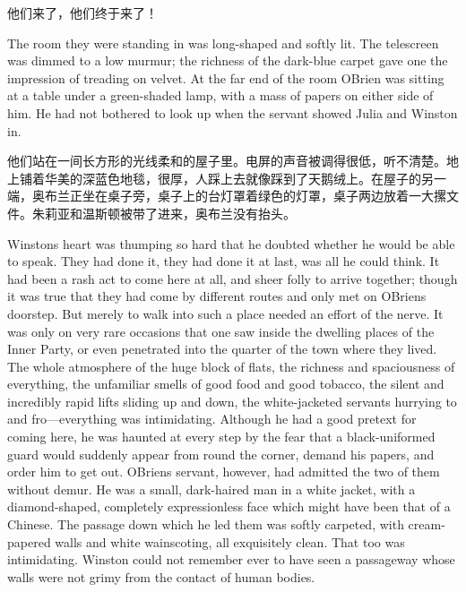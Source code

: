 \begin{paracol}{2}
他们来了，他们终于来了！

\switchcolumn*

The room they were standing in was long-shaped and softly lit. The
telescreen was dimmed to a low murmur; the richness of the dark-blue
carpet gave one the impression of treading on velvet. At the far end of
the room O\textquotesingle Brien was sitting at a table under a
green-shaded lamp, with a mass of papers on either side of him. He had
not bothered to look up when the servant showed Julia and Winston in.

\switchcolumn

他们站在一间长方形的光线柔和的屋子里。电屏的声音被调得很低，听不清楚。地上铺着华美的深蓝色地毯，很厚，人踩上去就像踩到了天鹅绒上。在屋子的另一端，奥布兰正坐在桌子旁，桌子上的台灯罩着绿色的灯罩，桌子两边放着一大摞文件。朱莉亚和温斯顿被带了进来，奥布兰没有抬头。

\switchcolumn*

Winston\textquotesingle s heart was thumping so hard that he doubted
whether he would be able to speak. They had done it, they had done it at
last, was all he could think. It had been a rash act to come here at
all, and sheer folly to arrive together; though it was true that they
had come by different routes and only met on
O\textquotesingle Brien\textquotesingle s doorstep. But merely to walk
into such a place needed an effort of the nerve. It was only on very
rare occasions that one saw inside the dwelling places of the Inner
Party, or even penetrated into the quarter of the town where they lived.
The whole atmosphere of the huge block of flats, the richness and
spaciousness of everything, the unfamiliar smells of good food and good
tobacco, the silent and incredibly rapid lifts sliding up and down, the
white-jacketed servants hurrying to and fro---everything was
intimidating. Although he had a good pretext for coming here, he was
haunted at every step by the fear that a black-uniformed guard would
suddenly appear from round the corner, demand his papers, and order him
to get out. O\textquotesingle Brien\textquotesingle s servant, however,
had admitted the two of them without demur. He was a small, dark-haired
man in a white jacket, with a diamond-shaped, completely expressionless
face which might have been that of a Chinese. The passage down which he
led them was softly carpeted, with cream-papered walls and white
wainscoting, all exquisitely clean. That too was intimidating. Winston
could not remember ever to have seen a passageway whose walls were not
grimy from the contact of human bodies.


\end{paracol}
